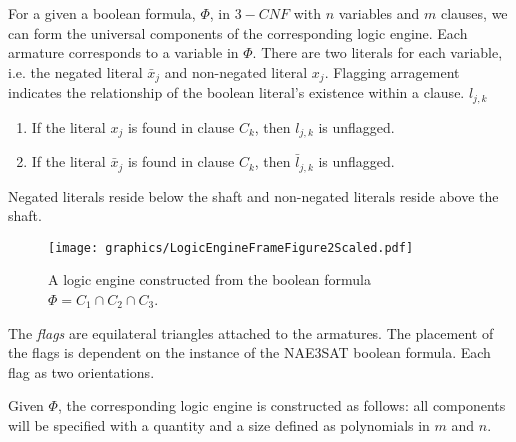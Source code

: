 For a given a boolean formula, $\Phi$, in $3-CNF$ with $n$ variables and $m$ clauses, we can form the universal components of the corresponding logic engine.  Each armature corresponds to a variable in $\Phi$. There are two literals for each variable, i.e. 
the negated literal $\bar{x}_j$ and non-negated literal $x_j$.   Flagging arragement 
indicates the relationship of the boolean literal's existence within a clause.  $l_{j,k}$ %
\begin{enumerate}
 \item If the literal $x_j$ is found in clause $C_k$, then $l_{j,k}$ is unflagged.
 \item If the literal $\bar{x}_j$ is found in clause $C_k$, then $\bar{l}_{j,k}$ is unflagged.
\end{enumerate}
Negated literals reside below the shaft and non-negated literals reside above the shaft.
\begin{figure}[!h]
\begin{center}
\texttt{[image: graphics/LogicEngineFrameFigure2Scaled.pdf]}
\caption{A logic engine constructed from the boolean formula $\Phi = C_1 \cap C_2 \cap C_3$.}
\label{fig:LogicEngineFrameFigure2Scaled.pdf}
\end{center}
\end{figure}
The \textit{flags} are equilateral triangles 
attached to the armatures.  The placement of the flags is dependent on the instance of the NAE3SAT 
boolean formula. Each flag as two orientations.

Given $\Phi$, the corresponding logic engine is constructed as follows: all components will be specified with a 
quantity and a size defined as polynomials in $m$ and $n$.

